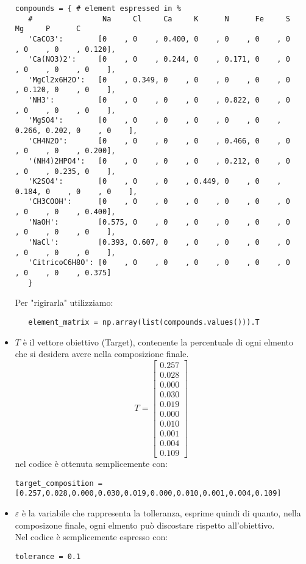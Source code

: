 \documentclass{article}
\begin{document}
\begin{itemize}
        \begin{lstlisting} 
compounds = { # element espressed in %
   #                Na     Cl     Ca     K      N      Fe     S      Mg     P      C
   'CaCO3':        [0    , 0    , 0.400, 0    , 0    , 0    , 0    , 0    , 0    , 0.120],
   'Ca(NO3)2':     [0    , 0    , 0.244, 0    , 0.171, 0    , 0    , 0    , 0    , 0    ],
   'MgCl2x6H2O':   [0    , 0.349, 0    , 0    , 0    , 0    , 0    , 0.120, 0    , 0    ],
   'NH3':          [0    , 0    , 0    , 0    , 0.822, 0    , 0    , 0    , 0    , 0    ],
   'MgSO4':        [0    , 0    , 0    , 0    , 0    , 0    , 0.266, 0.202, 0    , 0    ],
   'CH4N2O':       [0    , 0    , 0    , 0    , 0.466, 0    , 0    , 0    , 0    , 0.200],
   '(NH4)2HPO4':   [0    , 0    , 0    , 0    , 0.212, 0    , 0    , 0    , 0.235, 0    ],
   'K2SO4':        [0    , 0    , 0    , 0.449, 0    , 0    , 0.184, 0    , 0    , 0    ],
   'CH3COOH':      [0    , 0    , 0    , 0    , 0    , 0    , 0    , 0    , 0    , 0.400],
   'NaOH':         [0.575, 0    , 0    , 0    , 0    , 0    , 0    , 0    , 0    , 0    ],
   'NaCl':         [0.393, 0.607, 0    , 0    , 0    , 0    , 0    , 0    , 0    , 0    ],
   'CitricoC6H8O': [0    , 0    , 0    , 0    , 0    , 0    , 0    , 0    , 0    , 0.375]
   }    \end{lstlisting}
   Per "rigirarla" utilizziamo:
    \begin{lstlisting} 
   element_matrix = np.array(list(compounds.values())).T
    \end{lstlisting}
\item $T$ è il vettore obiettivo (Target), contenente la percentuale di ogni elmento che si desidera avere nella composizione finale.
\[T = \begin{bmatrix}0.257 \\ 0.028 \\ 0.000 \\ 0.030 \\ 0.019 \\ 0.000 \\ 0.010 \\ 0.001 \\ 0.004 \\ 0.109 \end{bmatrix}\]
nel codice è ottenuta semplicemente con:
\begin{lstlisting}
target_composition =[0.257,0.028,0.000,0.030,0.019,0.000,0.010,0.001,0.004,0.109]
\end{lstlisting}
\item $\varepsilon$ è la variabile che rappresenta la tolleranza, esprime quindi di quanto, nella composizone finale, ogni elmento può discostare rispetto all'obiettivo. \\ Nel codice è semplicemente espresso con:  
\begin{lstlisting}
tolerance = 0.1
\end{lstlisting}

\end{itemize}
\end{document}
